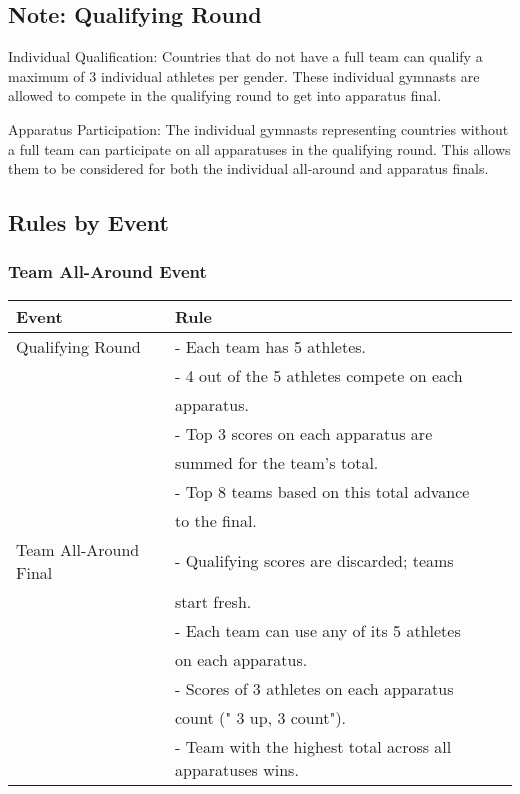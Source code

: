 \documentclass{article}
\theoremstyle{roman}
\begin{document}
\subsection{Note: Qualifying Round}
Individual Qualification: Countries that do not have a full team can qualify a maximum of 3 individual athletes per gender. These individual gymnasts are allowed to compete in the qualifying round to get into apparatus final.

Apparatus Participation: The individual gymnasts representing countries without a full team can participate on all apparatuses in the qualifying round. This allows them to be considered for both the individual all-around and apparatus finals.

\subsection{Rules by Event}
\subsubsection{Team All-Around Event}
\begin{center}
\begin{tabular}{|l|l|}
\hline
Event & Rule \\
\hline
Qualifying Round & - Each team has 5 athletes. \\
 & - 4 out of the 5 athletes compete on each \\
 & apparatus. \\
 & - Top 3 scores on each apparatus are \\
 & summed for the team's total. \\
 & - Top 8 teams based on this total advance \\
 & to the final. \\
\hline
Team All-Around Final & - Qualifying scores are discarded; teams \\
 & start fresh. \\
 & - Each team can use any of its 5 athletes \\
 & on each apparatus. \\
 & - Scores of 3 athletes on each apparatus \\
 & count (" 3 up, 3 count"). \\
 & - Team with the highest total across all apparatuses wins. \\ \hline
\end{tabular}
\end{center}
\end{document}
